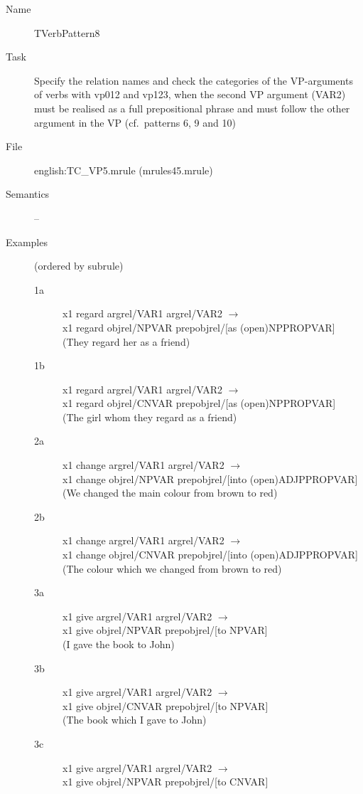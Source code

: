 \begin{description}
\vspace{1 cm}
\begin{description}
\item[Name] TVerbPattern8
\item[Task] Specify the relation names and check the categories of the VP-arguments 
of verbs with vp012 and vp123, when the second VP argument (VAR2) must be realised 
as a full prepositional 
phrase and must follow the other argument in the VP (cf.\ patterns 6, 9 and 10) 
\item[File] english:TC\_VP5.mrule (mrules45.mrule)
\item[Semantics] --
\item[Examples] (ordered by subrule)
  \begin{description}
  \item[1a] x1 regard argrel/VAR1 argrel/VAR2 $\rightarrow$ \\
x1 regard    objrel/NPVAR prepobjrel/[as (open)NPPROPVAR] \\
(They regard her as a friend)
  \item[1b] x1 regard argrel/VAR1 argrel/VAR2 $\rightarrow$ \\
x1 regard    objrel/CNVAR prepobjrel/[as (open)NPPROPVAR] \\
(The girl whom they regard as a friend)
  \item[2a] x1 change argrel/VAR1 argrel/VAR2 $\rightarrow$ \\
x1 change    objrel/NPVAR prepobjrel/[into (open)ADJPPROPVAR] \\
(We changed the main colour from brown to red)
  \item[2b] x1 change argrel/VAR1 argrel/VAR2 $\rightarrow$ \\
x1 change    objrel/CNVAR prepobjrel/[into (open)ADJPPROPVAR] \\
(The colour which we changed from brown to red)
  \item[3a] x1 give argrel/VAR1 argrel/VAR2 $\rightarrow$ \\
x1 give    objrel/NPVAR prepobjrel/[to NPVAR] \\
(I gave the book to John)
  \item[3b] x1 give argrel/VAR1 argrel/VAR2 $\rightarrow$ \\
x1 give    objrel/CNVAR prepobjrel/[to NPVAR] \\
(The book which I gave to John)
  \item[3c] x1 give argrel/VAR1 argrel/VAR2 $\rightarrow$ \\
x1 give    objrel/NPVAR prepobjrel/[to CNVAR] \\

\end{description}
\end{description}
\end{description}
